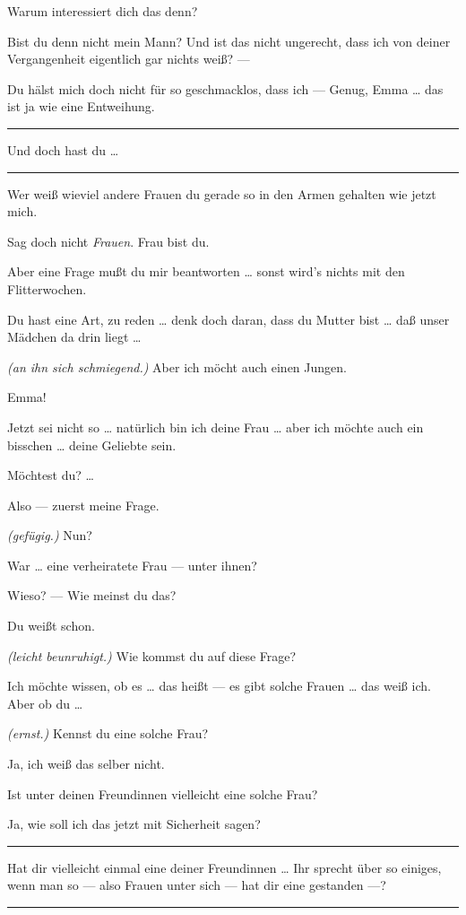 \documentclass[
	final,
	a4paper,
	ngerman,
	mpinclude = true, %
	twoside = true,
	open = right,
	cleardoublepage = plain,
	DIV = 13,
	BCOR = 1cm,
	titlepage = firstiscover,
	]{scrbook}
\newcommand{\direction}[1]{\textit{(#1)}}
\newenvironment{deletion}{%
		\vspace{0.25\baselineskip}
		\hrule
		\vspace{0.25\baselineskip}
		\color{darkgray}
	}{
		\color{black}
		\vspace{0.25\baselineskip}
		\hrule 
		\vspace{0.25\baselineskip}
	}
\newcommand{\thecharacter}[1]{\textup{\textsc{#1}}\xspace}
\newcommand{\thefrau}{\thecharacter{Emma}}
\newcommand{\thegatte}{\thecharacter{Christian}}
\newcommand{\character}[1]{\item[#1:]}
\newcommand{\frau}{\character{\thefrau}}
\newcommand{\gatte}{\character{\thegatte}}
\begin{document}
\begin{play}
	\gatte
	Warum interessiert dich das denn?

	\frau
	Bist du denn nicht mein Mann? Und ist das nicht ungerecht, dass ich von deiner Vergangenheit eigentlich gar nichts weiß? ---

	\gatte
	Du hälst mich doch nicht für so geschmacklos, dass ich --- Genug, Emma \ldots{} das ist ja wie eine Entweihung.

	\frau
	\begin{deletion}
		Und doch hast du \ldots{}
	\end{deletion}
	Wer weiß wieviel andere Frauen du gerade so in den Armen gehalten wie jetzt mich.

	\gatte
	Sag doch nicht \emph{Frauen}. Frau bist du.

	\frau
	Aber eine Frage mußt du mir beantworten \ldots{} sonst wird's nichts mit den Flitterwochen.

	\gatte
	Du hast eine Art, zu reden \ldots{} denk doch daran, dass du Mutter bist \ldots{} daß unser Mädchen da drin liegt \ldots{}

	\frau
	\direction{an ihn sich schmiegend.} Aber ich möcht auch einen Jungen.

	\gatte
	Emma!

	\frau
	Jetzt sei nicht so \ldots{} natürlich bin ich deine Frau \ldots{} aber ich möchte auch ein bisschen \ldots{} deine Geliebte sein.

	\gatte
	Möchtest du? \ldots{}

	\frau
	Also --- zuerst meine Frage.

	\gatte
	\direction{gefügig.} Nun?

	\frau
	War \ldots{} eine verheiratete Frau --- unter ihnen?

	\gatte
	Wieso? --- Wie meinst du das?

	\frau
	Du weißt schon.

	\gatte
	\direction{leicht beunruhigt.} Wie kommst du auf diese Frage?

	\frau
	Ich möchte wissen, ob es \ldots{} das heißt --- es gibt solche Frauen \ldots{} das weiß ich. Aber ob du \ldots{}

	\gatte
	\direction{ernst.} Kennst du eine solche Frau?

	\frau
	Ja, ich weiß das selber nicht.

	\gatte
	Ist unter deinen Freundinnen vielleicht eine solche Frau?

	\frau
	Ja, wie soll ich das jetzt mit Sicherheit sagen?

	\begin{deletion}
	\gatte
	Hat dir vielleicht einmal eine deiner Freundinnen \ldots{} Ihr sprecht über so einiges, wenn man so --- also Frauen unter sich --- hat dir eine gestanden ---?


\end{deletion}
\end{play}
\end{document}
